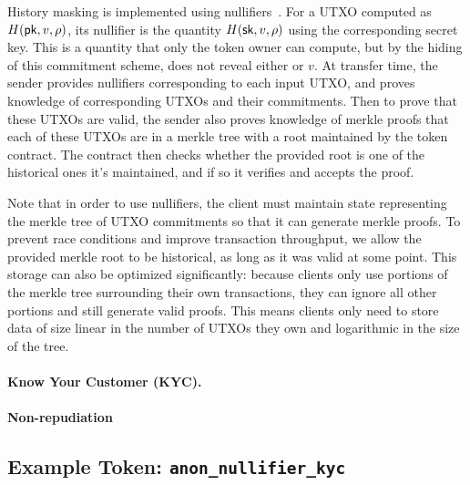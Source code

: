History masking is implemented using nullifiers~\cite{TODO}. For a UTXO computed as $H(\mathsf{pk}, v, \rho)$, its nullifier is the quantity $H(\mathsf{sk}, v, \rho)$ using the corresponding secret key. This is a quantity that only the token owner can compute, but by the hiding of this commitment scheme, does not reveal either \sk or $v$. At transfer time, the sender provides nullifiers corresponding to each input UTXO, and proves knowledge of corresponding UTXOs and their commitments. Then to prove that these UTXOs are valid, the sender also proves knowledge of merkle proofs that each of these UTXOs are in a merkle tree with a root maintained by the token contract. The contract then checks whether the provided root is one of the historical ones it's maintained, and if so it verifies and accepts the proof.

Note that in order to use nullifiers, the client must maintain state representing the merkle tree of UTXO commitments so that it can generate merkle proofs. To prevent race conditions and improve transaction throughput, we allow the provided merkle root to be historical, as long as it was valid at some point. This storage can also be optimized significantly: because clients only use portions of the merkle tree surrounding their own transactions, they can ignore all other portions and still generate valid proofs. This means clients only need to store data of size linear in the number of UTXOs they own and logarithmic in the size of the tree.


\paragraph{Know Your Customer (KYC).}


\paragraph{Non-repudiation}





\subsection{Example Token: \texttt{anon\_nullifier\_kyc}} %

